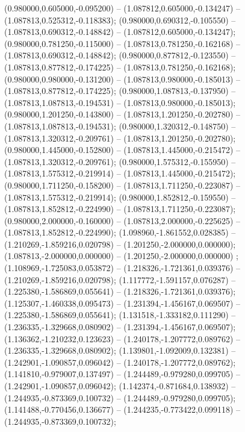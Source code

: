  (0.980000,0.605000,-0.095200) -- (1.087812,0.605000,-0.134247) -- (1.087813,0.525312,-0.118383);
 (0.980000,0.690312,-0.105550) -- (1.087813,0.690312,-0.148842) -- (1.087812,0.605000,-0.134247);
 (0.980000,0.781250,-0.115000) -- (1.087813,0.781250,-0.162168) -- (1.087813,0.690312,-0.148842);
 (0.980000,0.877812,-0.123550) -- (1.087813,0.877812,-0.174225) -- (1.087813,0.781250,-0.162168);
 (0.980000,0.980000,-0.131200) -- (1.087813,0.980000,-0.185013) -- (1.087813,0.877812,-0.174225);
 (0.980000,1.087813,-0.137950) -- (1.087813,1.087813,-0.194531) -- (1.087813,0.980000,-0.185013);
 (0.980000,1.201250,-0.143800) -- (1.087813,1.201250,-0.202780) -- (1.087813,1.087813,-0.194531);
 (0.980000,1.320312,-0.148750) -- (1.087813,1.320312,-0.209761) -- (1.087813,1.201250,-0.202780);
 (0.980000,1.445000,-0.152800) -- (1.087813,1.445000,-0.215472) -- (1.087813,1.320312,-0.209761);
 (0.980000,1.575312,-0.155950) -- (1.087813,1.575312,-0.219914) -- (1.087813,1.445000,-0.215472);
 (0.980000,1.711250,-0.158200) -- (1.087813,1.711250,-0.223087) -- (1.087813,1.575312,-0.219914);
 (0.980000,1.852812,-0.159550) -- (1.087813,1.852812,-0.224990) -- (1.087813,1.711250,-0.223087);
 (0.980000,2.000000,-0.160000) -- (1.087813,2.000000,-0.225625) -- (1.087813,1.852812,-0.224990);
 (1.098960,-1.861552,0.028385) -- (1.210269,-1.859216,0.020798) -- (1.201250,-2.000000,0.000000);
 (1.087813,-2.000000,0.000000) -- (1.201250,-2.000000,0.000000) ;
 (1.108969,-1.725083,0.053872) -- (1.218326,-1.721361,0.039376) -- (1.210269,-1.859216,0.020798);
 (1.117772,-1.591157,0.076287) -- (1.225380,-1.586869,0.055641) -- (1.218326,-1.721361,0.039376);
 (1.125307,-1.460338,0.095473) -- (1.231394,-1.456167,0.069507) -- (1.225380,-1.586869,0.055641);
 (1.131518,-1.333182,0.111290) -- (1.236335,-1.329668,0.080902) -- (1.231394,-1.456167,0.069507);
 (1.136362,-1.210232,0.123623) -- (1.240178,-1.207772,0.089762) -- (1.236335,-1.329668,0.080902);
 (1.139801,-1.092009,0.132381) -- (1.242901,-1.090857,0.096042) -- (1.240178,-1.207772,0.089762);
 (1.141810,-0.979007,0.137497) -- (1.244489,-0.979280,0.099705) -- (1.242901,-1.090857,0.096042);
 (1.142374,-0.871684,0.138932) -- (1.244935,-0.873369,0.100732) -- (1.244489,-0.979280,0.099705);
 (1.141488,-0.770456,0.136677) -- (1.244235,-0.773422,0.099118) -- (1.244935,-0.873369,0.100732);
